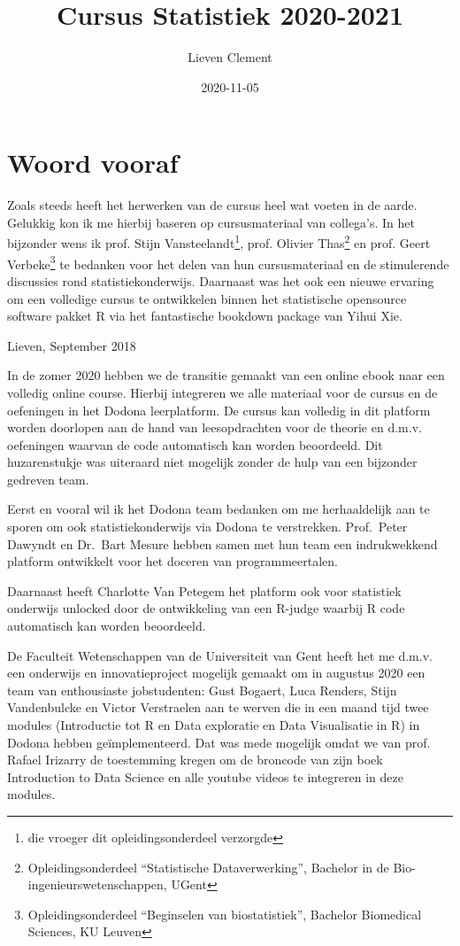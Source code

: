 \documentclass[
  12pt,dutch,coursenotes]{book}
\title{Cursus Statistiek 2020-2021}
\author{Lieven Clement}
\date{2020-11-05}
\theoremstyle{definition}
\theoremstyle{definition}
\theoremstyle{definition}
\theoremstyle{remark}
\begin{document}
\maketitle

{
\setcounter{tocdepth}{1}
\tableofcontents
}
\hypertarget{woord-vooraf}{%
\chapter*{Woord vooraf}\label{woord-vooraf}}

Zoals steeds heeft het herwerken van de cursus heel wat voeten in de aarde. Gelukkig kon ik me hierbij baseren op cursusmateriaal van collega's. In het bijzonder wens ik prof. Stijn Vansteelandt\footnote{die vroeger dit opleidingsonderdeel verzorgde}, prof. Olivier Thas\footnote{Opleidingsonderdeel ``Statistische Dataverwerking'', Bachelor in de Bio-ingenieurswetenschappen, UGent} en prof. Geert Verbeke\footnote{Opleidingsonderdeel ``Beginselen van biostatistiek'', Bachelor Biomedical Sciences, KU Leuven} te bedanken voor het delen van hun cursusmateriaal en de stimulerende discussies rond statistiekonderwijs. Daarnaast was het ook een nieuwe ervaring om een volledige cursus te ontwikkelen binnen het statistische opensource software pakket R via het fantastische bookdown package van Yihui Xie.

Lieven, September 2018

In de zomer 2020 hebben we de transitie gemaakt van een online ebook naar een volledig online course.
Hierbij integreren we alle materiaal voor de cursus en de oefeningen in het Dodona leerplatform.
De cursus kan volledig in dit platform worden doorlopen aan de hand van leesopdrachten voor de theorie en d.m.v. oefeningen waarvan de code automatisch kan worden beoordeeld.
Dit huzarenstukje was uiteraard niet mogelijk zonder de hulp van een bijzonder gedreven team.

Eerst en vooral wil ik het Dodona team bedanken om me herhaaldelijk aan te sporen om ook statistiekonderwijs via Dodona te verstrekken. Prof.~Peter Dawyndt en Dr.~Bart Mesure hebben samen met hun team een indrukwekkend platform ontwikkelt voor het doceren van programmeertalen.

Daarnaast heeft Charlotte Van Petegem het platform ook voor statistiek onderwijs unlocked door de ontwikkeling van een R-judge waarbij R code automatisch kan worden beoordeeld.

De Faculteit Wetenschappen van de Universiteit van Gent heeft het me d.m.v. een onderwijs en innovatieproject mogelijk gemaakt om in augustus 2020 een team van enthousiaste jobstudenten: Gust Bogaert, Luca Renders, Stijn Vandenbulcke en Victor Verstraelen aan te werven die in een maand tijd twee modules (Introductie tot R en Data exploratie en Data Visualisatie in R) in Dodona hebben geïmplementeerd. Dat was mede mogelijk omdat we van prof. Rafael Irizarry de toestemming kregen om de broncode van zijn boek Introduction to Data Science en alle youtube videos te integreren in deze modules.
\end{document}
